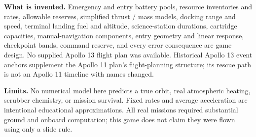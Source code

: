 \textbf{What is invented.} Emergency and entry battery pools, resource
inventories and rates, allowable reserves, simplified thrust / mass
models, docking range and speed, terminal landing fuel and altitude,
science-station durations, cartridge capacities, manual-navigation
components, entry geometry and linear response, checkpoint bands,
command reserve, and every error consequence are game design.
No supplied Apollo 13 flight plan was available.
Historical Apollo 13 event anchors supplement the Apollo 11 plan's
flight-planning structure; its rescue path is not an Apollo 11 timeline
with names changed.

\textbf{Limits.} No numerical model here predicts a true orbit,
real atmospheric heating, scrubber chemistry, or mission survival.
Fixed rates and average acceleration are intentional educational
approximations. All real missions required substantial ground and
onboard computation; this game does not claim they were flown using
only a slide rule.
